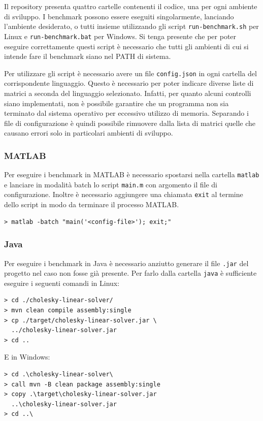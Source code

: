 \documentclass[a4paper, 12pt]{article}
\begin{document}
Il repository presenta quattro cartelle contenenti il codice, una per ogni
ambiente di sviluppo. I benchmark possono essere eseguiti singolarmente,
lanciando l'ambiente desiderato, o tutti insieme utilizzando gli script
\texttt{run-benchmark.sh} per Linux e \texttt{run-benchmark.bat} per Windows. Si
tenga presente che per poter eseguire correttamente questi script è necessario
che tutti gli ambienti di cui si intende fare il benchmark siano nel PATH di
sistema.

Per utilizzare gli script è necessario avere un file \texttt{config.json} in
ogni cartella del corrispondente linguaggio.
Questo è necessario per poter indicare diverse liste di matrici a seconda del
linguaggio selezionato. Infatti, per quanto alcuni controlli siano implementati,
non è possibile garantire che un programma non sia terminato dal sistema
operativo per eccessivo utilizzo di memoria. Separando i file di configurazione
è quindi possibile rimuovere dalla lista di matrici quelle che causano errori
solo in particolari ambienti di sviluppo.

\subsubsection{MATLAB}
Per eseguire i benchmark in MATLAB è necessario spostarsi nella cartella
\texttt{matlab} e lanciare in modalità batch lo script \texttt{main.m} con
argomento il file di configurazione. Inoltre è necessario aggiungere una
chiamata \texttt{exit} al termine dello script in modo da terminare il processo
MATLAB.
\begin{lstlisting}[frame=single]
> matlab -batch "main('<config-file>'); exit;"
\end{lstlisting}

\subsubsection{Java}
Per eseguire i benchmark in Java è necessario anziutto generare il file 
\texttt{.jar} del progetto nel caso non fosse già presente. Per farlo dalla 
cartella \texttt{java} è sufficiente eseguire i seguenti comandi in Linux:
\begin{lstlisting}[frame=single]
> cd ./cholesky-linear-solver/
> mvn clean compile assembly:single
> cp ./target/cholesky-linear-solver.jar \
  ../cholesky-linear-solver.jar
> cd ..
\end{lstlisting}

E in Windows:
\begin{lstlisting}[frame=single]
> cd .\cholesky-linear-solver\
> call mvn -B clean package assembly:single
> copy .\target\cholesky-linear-solver.jar 
  ..\cholesky-linear-solver.jar
> cd ..\
\end{lstlisting}
\end{document}
